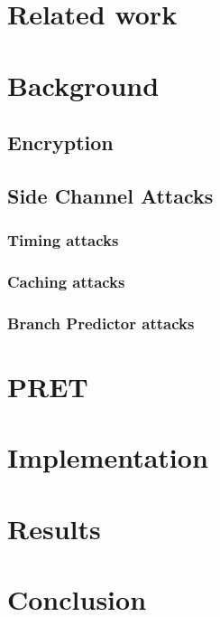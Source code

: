 \documentclass[times, 10pt,twocolumn]{article}
\begin{document}
\section{Related work}

\section{Background}
\subsection{Encryption}

\subsection{Side Channel Attacks}
\subsubsection{Timing attacks}
\subsubsection{Caching attacks}
\subsubsection{Branch Predictor attacks}

\section{PRET}


\section{Implementation}

\section{Results}


\section{Conclusion}




\end{document}
